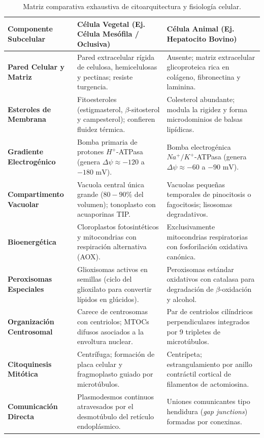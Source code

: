 \documentclass[spanish,letterpaper,oneside]{article}
\begin{document}
\begin{table}[h!]
\centering
\footnotesize
\begin{tabularx}{\textwidth}{lYY}
\toprule
\textbf{Componente Subcelular} & \textbf{Célula Vegetal (Ej. Célula Mesófila / Oclusiva)} & \textbf{Célula Animal (Ej. Hepatocito Bovino)} \\
\midrule
\textbf{Pared Celular y Matriz} & Pared extracelular rígida de celulosa, hemicelulosas y pectinas; resiste turgencia. & Ausente; matriz extracelular glicoproteica rica en colágeno, fibronectina y laminina. \\
\textbf{Esteroles de Membrana} & Fitoesteroles (estigmasterol, $\beta$-sitosterol y campesterol); confieren fluidez térmica. & Colesterol abundante; modula la rigidez y forma microdominios de balsas lipídicas. \\
\textbf{Gradiente Electrogénico} & Bomba primaria de protones $H^+$-ATPasa (genera $\Delta\psi \approx -120$ a $-180\text{ mV}$). & Bomba electrogénica $Na^+/K^+$-ATPasa (genera $\Delta\psi \approx -60$ a $-90\text{ mV}$). \\
\textbf{Compartimento Vacuolar} & Vacuola central única grande ($80-90\%$ del volumen); tonoplasto con acuaporinas TIP. & Vacuolas pequeñas temporales de pinocitosis o fagocitosis; lisosomas degradativos. \\
\textbf{Bioenergética} & Cloroplastos fotosintéticos y mitocondrias con respiración alternativa (AOX). & Exclusivamente mitocondrias respiratorias con fosforilación oxidativa canónica. \\
\textbf{Peroxisomas Especiales} & Glioxisomas activos en semillas (ciclo del glioxilato para convertir lípidos en glúcidos). & Peroxisomas estándar oxidativos con catalasa para degradación de $\beta$-oxidación y alcohol. \\
\textbf{Organización Centrosomal} & Carece de centrosomas con centriolos; MTOCs difusos asociados a la envoltura nuclear. & Par de centriolos cilíndricos perpendiculares integrados por 9 tripletes de microtúbulos. \\
\textbf{Citoquinesis Mitótica} & Centrífuga; formación de placa celular y fragmoplasto guiado por microtúbulos. & Centrípeta; estrangulamiento por anillo contráctil cortical de filamentos de actomiosina. \\
\textbf{Comunicación Directa} & Plasmodesmos continuos atravesados por el desmotúbulo del retículo endoplásmico. & Uniones comunicantes tipo hendidura (\textit{gap junctions}) formadas por conexinas. \\
\bottomrule
\end{tabularx}
\caption{Matriz comparativa exhaustiva de citoarquitectura y fisiología celular.}
\end{table}
\end{document}
